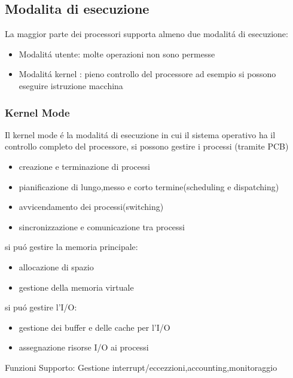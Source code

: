 \documentclass[11pt]{article}
\begin{document}
\subsection{Modalita di esecuzione}
La maggior parte dei processori supporta almeno due modalitá di esecuzione:
\begin{itemize}
    \item Modalitá utente: molte operazioni non sono permesse
    \item Modalitá kernel : pieno controllo del processore ad esempio si possono eseguire istruzione macchina
\end{itemize}
\subsubsection{Kernel Mode}
Il kernel mode é la modalitá di esecuzione in cui il sistema operativo ha il controllo completo del processore,
si possono gestire i processi (tramite PCB)
\begin{itemize}
    \item creazione e terminazione di processi
    \item pianificazione di lungo,messo e corto termine(scheduling e dispatching)
    \item avvicendamento dei processi(switching)
    \item sincronizzazione e comunicazione tra processi
\end{itemize}
si puó gestire la memoria principale:
\begin{itemize}
    \item allocazione di spazio
    \item gestione della memoria virtuale
\end{itemize}
si puó gestire l'I/O:
\begin{itemize}
    \item gestione dei buffer e delle cache per l'I/O
    \item assegnazione risorse I/O ai processi
\end{itemize}
Funzioni Supporto: Gestione interrupt/eccezzioni,accounting,monitoraggio
\end{document}
